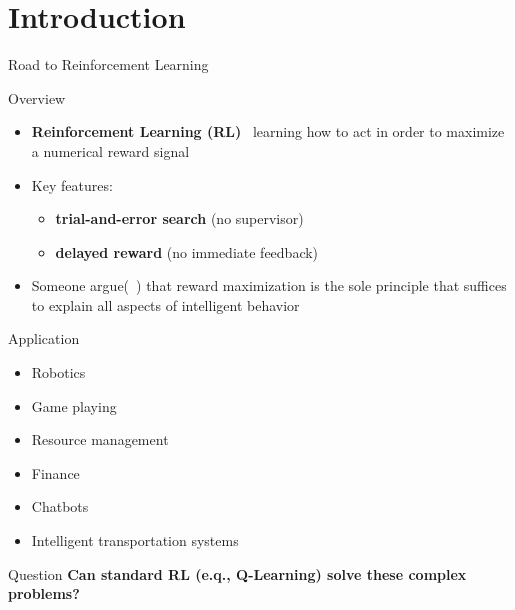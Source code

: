 \documentclass[presentation, 9pt]{beamer}\mode<presentation>{\usetheme{AMSBolognaFC}}
\begin{document}
\section{Introduction}
\begin{frame}{Road to  Reinforcement Learning}
	\begin{block}{Overview}
		\begin{itemize}
		\item \textbf{Reinforcement Learning (RL)} \faArrowRight \, learning how to act in order to maximize a numerical reward signal
		\item Key features:
		\begin{itemize}
			\item \textbf{trial-and-error search} (no supervisor)
			\item \textbf{delayed reward} (no immediate feedback)
		\end{itemize}
		\item Someone argue(~\cite{SILVER2021103535}) that reward maximization is the sole principle that suffices to explain all aspects of intelligent behavior
	\end{itemize}
	\end{block}
	\begin{block}{Application}
		\begin{multicols}{2}
		\begin{itemize}
			\item Robotics
			\item Game playing
			\item Resource management
			\item Finance
			\item Chatbots
			\item Intelligent transportation systems
		\end{itemize}
		\end{multicols}
	\end{block}

	\begin{alertblock}{Question}
		\centering
		\textbf{Can standard RL (e.q., Q-Learning) solve these complex problems?}		
	\end{alertblock}
\end{frame}
\end{document}
